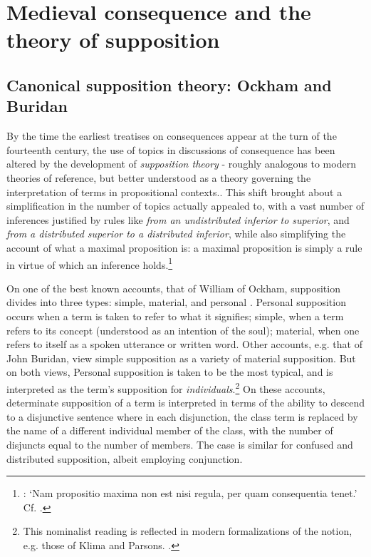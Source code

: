\documentclass[a4paper, 11pt]{article}
\begin{document}
\section{Medieval consequence and the theory of supposition}
\subsection{Canonical supposition theory: Ockham and Buridan}
By the time the earliest treatises on consequences appear at the turn of the fourteenth century, the use of topics in discussions of consequence has been  altered by the development of \emph{supposition theory} - roughly analogous to modern theories of reference, but better understood as a theory governing the interpretation of terms in propositional contexts.\autocite{DutilhNovaes2007,DutilhNovaes2008b}. This shift brought about a simplification in the number of topics actually appealed to, with a vast number of inferences justified by rules like \emph{from an undistributed inferior to superior}, and \emph{from a distributed superior to a distributed inferior}, while also simplifying the account of what a maximal proposition is: a maximal proposition is simply a rule in virtue of which an inference holds.\footnote{\autocite[76.5-7]{BurleyDPAL}: `Nam propositio maxima non est nisi regula, per quam consequentia tenet.' Cf. \autocite[31.3-6]{OckhamEL}.}

On one of the best known accounts, that of William of Ockham, supposition divides into three types: simple, material, and personal \autocite[193-197]{OckhamSL}. Personal supposition occurs when a term is taken to refer to what it signifies; simple,  when a term refers to its concept (understood as an intention of the soul); material, when one refers to itself as a spoken utterance or written word. Other accounts, e.g. that of John Buridan, view simple supposition as a variety of material supposition. But on both views, Personal supposition is taken to be the most typical, and is interpreted as the term's supposition for \emph{individuals}.\footnote{This nominalist reading is reflected in modern formalizations of the notion, e.g. those of Klima and Parsons. \autocite{Klima1988,Parsons2014}.} On these accounts, determinate supposition of a term is interpreted in terms of the ability to descend to a disjunctive sentence where in each disjunction, the class term is replaced by the name of a different individual member of the class, with the number of disjuncts equal to the number of members. The case is similar for confused and distributed supposition, albeit employing conjunction.
\end{document}
